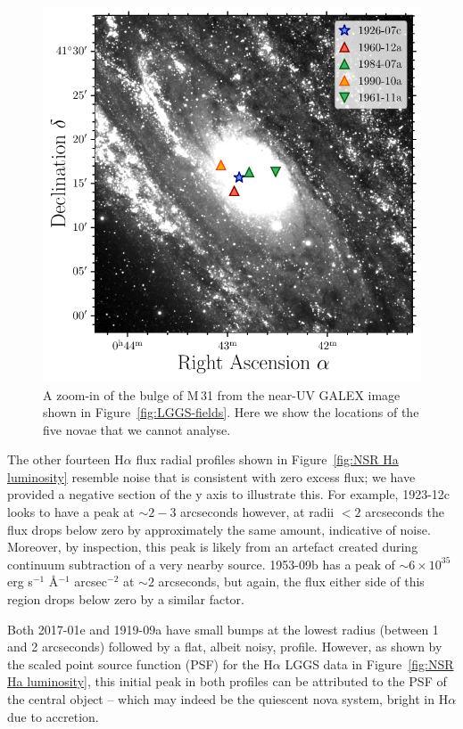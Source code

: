 \documentclass[fleqn,usenatbib]{mnras}
\begin{document}
\begin{figure}
\includegraphics[width=\columnwidth]{Figures/GALEX_M31_Bulge_Zoom.pdf}
\caption{A zoom-in of the bulge of M\,31 from the near-UV GALEX image shown in Figure~\ref{fig:LGGS-fields}. Here we show the locations of the five novae that we cannot analyse.\label{fig:M31 bulge RNe}}
\end{figure}

The other fourteen H$\alpha$ flux radial profiles shown in Figure~\ref{fig:NSR Ha luminosity} resemble noise that is consistent with zero excess flux; we have provided a negative section of the y axis to illustrate this. For example, 1923-12c looks to have a peak at ${\sim}2 - 3$ arcseconds however, at radii $<2$ arcseconds the flux drops below zero by approximately the same amount, indicative of noise. Moreover, by inspection, this peak is likely from an artefact created during continuum subtraction of a very nearby source. 1953-09b has a peak of {$\sim$}$6 \times 10^{35}$ erg s$^{-1}$ \AA$^{-1}$ arcsec$^{-2}$ at ${\sim}2$ arcseconds, but again, the flux either side of this region drops below zero by a similar factor. 

Both 2017-01e and 1919-09a have small bumps at the lowest radius (between 1 and 2 arcseconds) followed by a flat, albeit noisy, profile. However, as shown by the scaled point source function (PSF) for the H$\alpha$ LGGS data in Figure~\ref{fig:NSR Ha luminosity}, this initial peak in both profiles can be attributed to the PSF of the central object -- which may indeed be the quiescent nova system, bright in H$\alpha$ due to accretion.
\end{document}
